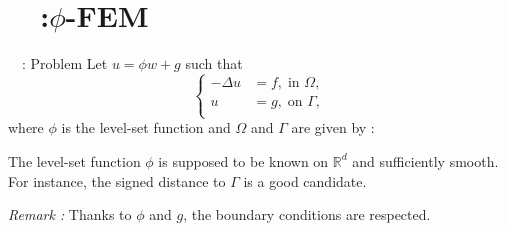 \section{\appendixname~\theappendixframenumber~:$\phi$-FEM}

\begin{frame}{\appendixname~\theappendixframenumber~: Problem}
	Let $u=\phi w+g$ such that
	$$\left\{\begin{aligned}
		-\Delta u &= f, \; \text{in } \Omega, \\
		u&=g, \; \text{on } \Gamma, \\
	\end{aligned}\right.$$
	where $\phi$ is the level-set function and $\Omega$ and $\Gamma$ are given by :
	\begin{center}
	\end{center}
	The level-set function $\phi$ is supposed to be known on $\mathbb{R}^d$ and sufficiently smooth. \\
	For instance, the signed distance to $\Gamma$ is a good candidate.
	
	\vspace{5pt}
	
	\footnotesize
	\textit{Remark :} Thanks to $\phi$ and $g$, the boundary conditions are respected.
\end{frame}

